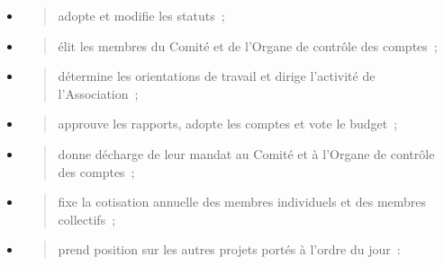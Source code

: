 \documentclass[10pt]{article}
\begin{document}
\begin{itemize}
\item
  \begin{quote}
  adopte et modifie les statuts~;
  \end{quote}
\item
  \begin{quote}
  élit les membres du Comité et de l'Organe de contrôle des comptes~;
  \end{quote}
\item
  \begin{quote}
  détermine les orientations de travail et dirige l'activité de
  l'Association~;
  \end{quote}
\item
  \begin{quote}
  approuve les rapports, adopte les comptes et vote le budget~;
  \end{quote}
\item
  \begin{quote}
  donne décharge de leur mandat au Comité et à l'Organe de contrôle des
  comptes~;
  \end{quote}
\item
  \begin{quote}
  fixe la cotisation annuelle des membres individuels et des membres
  collectifs~;
  \end{quote}
\item
  \begin{quote}
  prend position sur les autres projets portés à l'ordre du jour~:
  \end{quote}
\end{itemize}
\end{document}
